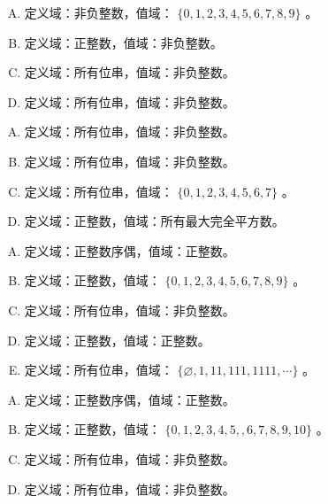 {{        %
        \begin{practices}
            \begin{enumerate}[A.]
                \item 定义域：非负整数，值域： $\{0, 1, 2, 3, 4, 5, 6, 7, 8, 9\}$ 。
                \item 定义域：正整数，值域：非负整数。
                \item 定义域：所有位串，值域：非负整数。
                \item 定义域：所有位串，值域：非负整数。
            \end{enumerate}
        \end{practices}

        \begin{practices}
            \begin{enumerate}[A.]
                \item 定义域：所有位串，值域：非负整数。
                \item 定义域：所有位串，值域：非负整数。
                \item 定义域：所有位串，值域： $\{0, 1, 2, 3, 4, 5, 6, 7\}$ 。
                \item 定义域：正整数，值域：所有最大完全平方数。
            \end{enumerate}
        \end{practices}

        \begin{practices}
            \begin{enumerate}[A.]
                \item 定义域：正整数序偶，值域：正整数。
                \item 定义域：正整数，值域： $\{0, 1, 2, 3, 4, 5, 6, 7, 8, 9\}$ 。
                \item 定义域：所有位串，值域：非负整数。
                \item 定义域：正整数，值域：正整数。
                \item 定义域：所有位串，值域： $\{\varnothing, 1, 11, 111, 1111, \cdots\}$ 。
            \end{enumerate}
        \end{practices}

        \begin{practices}
            \begin{enumerate}[A.]
                \item 定义域：正整数序偶，值域：正整数。
                \item 定义域：正整数，值域： $\{0, 1, 2, 3, 4, 5, ,6 ,7, 8, 9, 10\}$ 。
                \item 定义域：所有位串，值域：非负整数。
                \item 定义域：所有位串，值域：非负整数。
            \end{enumerate}
        \end{practices}

}}
